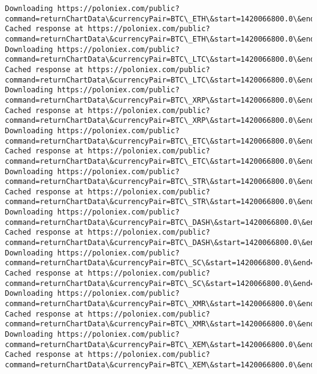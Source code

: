 \documentclass[11pt]{article}
\begin{document}
    \begin{Verbatim}[commandchars=\\\{\}]
Downloading https://poloniex.com/public?command=returnChartData\&currencyPair=BTC\_ETH\&start=1420066800.0\&end=1534702546.617485\&period=86400
Cached response at https://poloniex.com/public?command=returnChartData\&currencyPair=BTC\_ETH\&start=1420066800.0\&end=1534702546.617485\&period=86400
Downloading https://poloniex.com/public?command=returnChartData\&currencyPair=BTC\_LTC\&start=1420066800.0\&end=1534702546.617485\&period=86400
Cached response at https://poloniex.com/public?command=returnChartData\&currencyPair=BTC\_LTC\&start=1420066800.0\&end=1534702546.617485\&period=86400
Downloading https://poloniex.com/public?command=returnChartData\&currencyPair=BTC\_XRP\&start=1420066800.0\&end=1534702546.617485\&period=86400
Cached response at https://poloniex.com/public?command=returnChartData\&currencyPair=BTC\_XRP\&start=1420066800.0\&end=1534702546.617485\&period=86400
Downloading https://poloniex.com/public?command=returnChartData\&currencyPair=BTC\_ETC\&start=1420066800.0\&end=1534702546.617485\&period=86400
Cached response at https://poloniex.com/public?command=returnChartData\&currencyPair=BTC\_ETC\&start=1420066800.0\&end=1534702546.617485\&period=86400
Downloading https://poloniex.com/public?command=returnChartData\&currencyPair=BTC\_STR\&start=1420066800.0\&end=1534702546.617485\&period=86400
Cached response at https://poloniex.com/public?command=returnChartData\&currencyPair=BTC\_STR\&start=1420066800.0\&end=1534702546.617485\&period=86400
Downloading https://poloniex.com/public?command=returnChartData\&currencyPair=BTC\_DASH\&start=1420066800.0\&end=1534702546.617485\&period=86400
Cached response at https://poloniex.com/public?command=returnChartData\&currencyPair=BTC\_DASH\&start=1420066800.0\&end=1534702546.617485\&period=86400
Downloading https://poloniex.com/public?command=returnChartData\&currencyPair=BTC\_SC\&start=1420066800.0\&end=1534702546.617485\&period=86400
Cached response at https://poloniex.com/public?command=returnChartData\&currencyPair=BTC\_SC\&start=1420066800.0\&end=1534702546.617485\&period=86400
Downloading https://poloniex.com/public?command=returnChartData\&currencyPair=BTC\_XMR\&start=1420066800.0\&end=1534702546.617485\&period=86400
Cached response at https://poloniex.com/public?command=returnChartData\&currencyPair=BTC\_XMR\&start=1420066800.0\&end=1534702546.617485\&period=86400
Downloading https://poloniex.com/public?command=returnChartData\&currencyPair=BTC\_XEM\&start=1420066800.0\&end=1534702546.617485\&period=86400
Cached response at https://poloniex.com/public?command=returnChartData\&currencyPair=BTC\_XEM\&start=1420066800.0\&end=1534702546.617485\&period=86400

    \end{Verbatim}
\end{document}
